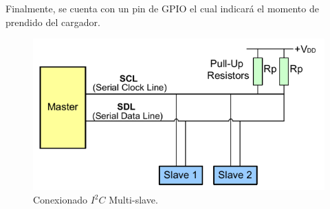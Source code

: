 Finalmente, se cuenta con un pin de GPIO el cual indicará el momento de prendido del cargador.

\begin{figure}[H]
	\centering
	\includegraphics[width=0.7\linewidth]{ImagenesIngenieria de Detalle/I2C_conexionado}	
	\caption{Conexionado $I^2C$ Multi-slave.}
	\label{fig:conexionado_i2c}
\end{figure}